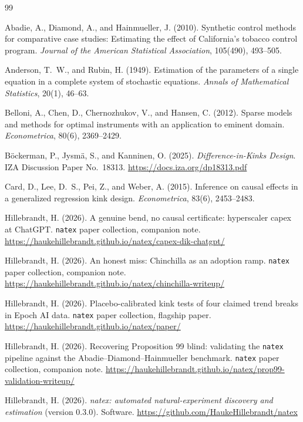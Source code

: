 \documentclass[11pt]{article}
\newcommand{\natex}{\texttt{natex}}
\begin{document}
\begin{thebibliography}{99}

Abadie, A., Diamond, A., and Hainmueller, J. (2010).
Synthetic control methods for comparative case studies: Estimating the effect of
California's tobacco control program.
\emph{Journal of the American Statistical Association}, 105(490), 493--505.

Anderson, T.~W., and Rubin, H. (1949).
Estimation of the parameters of a single equation in a complete system of stochastic
equations.
\emph{Annals of Mathematical Statistics}, 20(1), 46--63.

Belloni, A., Chen, D., Chernozhukov, V., and Hansen, C. (2012).
Sparse models and methods for optimal instruments with an application to eminent domain.
\emph{Econometrica}, 80(6), 2369--2429.

B\"ockerman, P., Jysm\"a, S., and Kanninen, O. (2025).
\emph{Difference-in-Kinks Design}.
IZA Discussion Paper No.~18313.
\url{https://docs.iza.org/dp18313.pdf}

Card, D., Lee, D.~S., Pei, Z., and Weber, A. (2015).
Inference on causal effects in a generalized regression kink design.
\emph{Econometrica}, 83(6), 2453--2483.

Hillebrandt, H. (2026).
A genuine bend, no causal certificate: hyperscaler capex at ChatGPT.
\natex{} paper collection, companion note.
\url{https://haukehillebrandt.github.io/natex/capex-dik-chatgpt/}

Hillebrandt, H. (2026).
An honest miss: Chinchilla as an adoption ramp.
\natex{} paper collection, companion note.
\url{https://haukehillebrandt.github.io/natex/chinchilla-writeup/}

Hillebrandt, H. (2026).
Placebo-calibrated kink tests of four claimed trend breaks in Epoch AI data.
\natex{} paper collection, flagship paper.
\url{https://haukehillebrandt.github.io/natex/paper/}

Hillebrandt, H. (2026).
Recovering Proposition 99 blind: validating the \natex{} pipeline against the
Abadie--Diamond--Hainmueller benchmark.
\natex{} paper collection, companion note.
\url{https://haukehillebrandt.github.io/natex/prop99-validation-writeup/}

Hillebrandt, H. (2026).
\emph{natex: automated natural-experiment discovery and estimation} (version 0.3.0).
Software.
\url{https://github.com/HaukeHillebrandt/natex}


\end{thebibliography}
\end{document}
